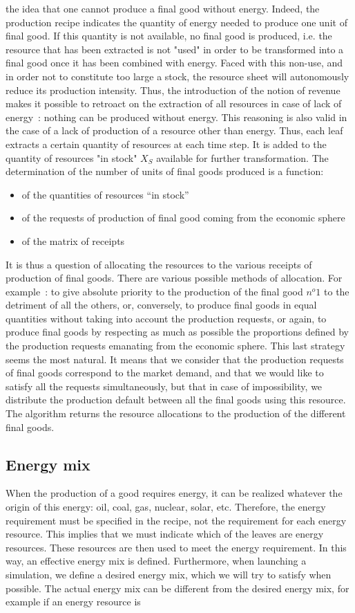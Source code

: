 \documentclass[12pt,a4paper]{article}%
\begin{document}
\begin{appendix}
the idea that one cannot produce a final good without energy. Indeed, the production recipe indicates the quantity of energy needed to produce one unit of final good. If this quantity is not available, no final good is produced, i.e. the resource that has been extracted is not "used" in order to be transformed into a final good once it has been combined with energy. Faced with this non-use, and in order not to constitute too large a stock, the resource sheet will autonomously reduce its production intensity. Thus, the introduction of the notion of revenue makes it possible to retroact on the extraction of all resources in case of lack of energy~: nothing can be produced without energy. This reasoning is also valid in the case of a lack of production of a resource other than energy.  Thus, each leaf extracts a certain quantity of resources at each time step. It is added to the quantity of resources "in stock" $X_{S}$ available for further transformation. The determination of the number of units of final goods produced is a function:  \begin{itemize} \item of the quantities of resources ``in stock'' \item of the requests of production of final good coming from the economic sphere \item of the matrix of receipts~ \end{itemize} It is thus a question of allocating the resources to the various receipts of production of final goods. There are various possible methods of allocation. For example~: to give absolute priority to the production of the final good $n^{o}1$ to the detriment of all the others, or, conversely, to produce final goods in equal quantities without taking into account the production requests, or again, to produce final goods by respecting as much as possible the proportions defined by the production requests emanating from the economic sphere.  This last strategy seems the most natural. It means that we consider that the production requests of final goods correspond to the market demand, and that we would like to satisfy all the requests simultaneously, but that in case of impossibility, we distribute the production default between all the final goods using this resource. The algorithm returns the resource allocations to the production of the different final goods.  \subsection{Energy mix} When the production of a good requires energy, it can be realized whatever the origin of this energy: oil, coal, gas, nuclear, solar, etc. Therefore, the energy requirement must be specified in the recipe, not the requirement for each energy resource. This implies that we must indicate which of the leaves are energy resources. These resources are then used to meet the energy requirement. In this way, an effective energy mix is defined.  Furthermore, when launching a simulation, we define a desired energy mix, which we will try to satisfy when possible. The actual energy mix can be different from the desired energy mix, for example if an energy resource is 
\end{appendix}
\end{document}
